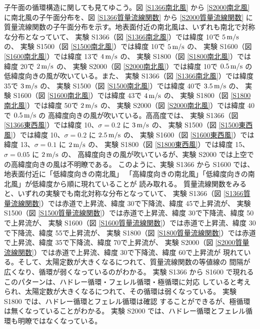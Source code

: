 \documentclass[body]{subfiles}
\begin{document}
子午面の循環構造に関しても見てゆこう。図 \ref{S1366南北風} から \ref{S2000南北風}
に南北風の子午面分布を、図 \ref{S1366質量流線関数} から \ref{S2000質量流線関数} に
質量流線関数の子午面分布を示す。地表面付近の南北風は、いずれも南北で対称な分布となっていて、
実験 S1366（図 \ref{S1366南北風}）では緯度 10\textdegree で \(5\hmu{m/s}\) の、
実験 S1500（図 \ref{S1500南北風}）では緯度 10\textdegree で \(5\hmu{m/s}\) の、
実験 S1600（図 \ref{S1600南北風}）では緯度 13\textdegree で \(4\hmu{m/s}\) の、
実験 S1800（図 \ref{S1800南北風}）では緯度 20\textdegree で \(2\hmu{m/s}\) の、
実験 S2000（図 \ref{S2000南北風}）では緯度 10\textdegree で \(0.5\hmu{m/s}\) の
低緯度向きの風が吹いている。また、
実験 S1366（図 \ref{S1366南北風}）では緯度 35\textdegree で \(3\hmu{m/s}\) の、
実験 S1500（図 \ref{S1500南北風}）では緯度 40\textdegree で \(3.5\hmu{m/s}\) の、
実験 S1600（図 \ref{S1600南北風}）では緯度 43\textdegree で \(4\hmu{m/s}\) の、
実験 S1800（図 \ref{S1800南北風}）では緯度 50\textdegree で \(2\hmu{m/s}\) の、
実験 S2000（図 \ref{S2000南北風}）では緯度 40\textdegree で \(0.5\hmu{m/s}\) の
高緯度向きの風が吹いている。高高度では、
実験 S1366（図 \ref{S1366東西風}）では緯度 10\textdegree 、\(\sigma=0.2\) に \(3\hmu{m/s}\) の、
実験 S1500（図 \ref{S1500東西風}）では緯度 10\textdegree 、\(\sigma=0.2\) に \(2.5\hmu{m/s}\) の、
実験 S1600（図 \ref{S1600東西風}）では緯度 13\textdegree 、\(\sigma=0.1\) に \(2\hmu{m/s}\) の、
実験 S1800（図 \ref{S1800東西風}）では緯度 15\textdegree 、\(\sigma=0.05\) に \(2\hmu{m/s}\) の、
高緯度向きの風が吹いているが、実験 S2000 では上空での高緯度向きの風は不明瞭である。
このように、実験 S1366 から S1600 では、地表面付近に「低緯度向きの南北風」
「高緯度向きの南北風」「低緯度向きの南北風」が低緯度から順に現れていることが
読み取れる。
質量流線関数をみると、いずれの実験でも南北対称な分布となっていて、
実験 S1366（図 \ref{S1366質量流線関数}）では赤道で上昇流、緯度 30\textdegree で下降流、緯度 45\textdegree で上昇流が、
実験 S1500（図 \ref{S1500質量流線関数}）では赤道で上昇流、緯度 30\textdegree で下降流、緯度 50\textdegree で上昇流が、
実験 S1600（図 \ref{S1600質量流線関数}）では赤道で上昇流、緯度 30\textdegree で下降流、緯度 55\textdegree で上昇流が、
実験 S1800（図 \ref{S1800質量流線関数}）では赤道で上昇流、緯度 35\textdegree で下降流、緯度 70\textdegree で上昇流が、
実験 S2000（図 \ref{S2000質量流線関数}）では赤道で上昇流、緯度 30\textdegree で下降流、緯度 60\textdegree で上昇流が
現れている。そして、太陽定数が大きくなるにつれて、質量流線関数の等値線の
間隔が広くなり、循環が弱くなっているのがわかる。
実験 S1366 から S1600 で現れるこのパターンは、ハドレー循環・フェレル循環・極循環に対応
していると考えられ、太陽定数が大きくなるにつれて、その循環は弱くなっている。
実験 S1800 では、ハドレー循環とフェレル循環は確認
することができるが、極循環は無くなっていることがわかる。
実験 S2000 では、ハドレー循環とフェレル循環も明瞭ではなくなっている。
\end{document}
